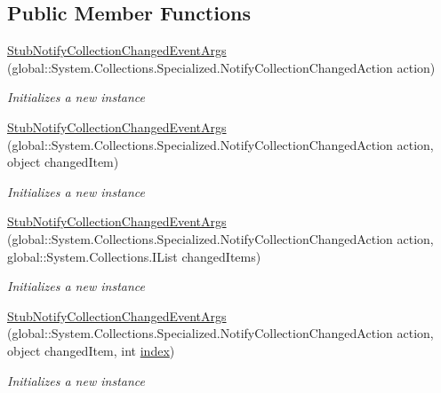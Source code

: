 \subsection*{Public Member Functions}
\begin{DoxyCompactItemize}
\item 
\hyperlink{class_system_1_1_collections_1_1_specialized_1_1_fakes_1_1_stub_notify_collection_changed_event_args_ad840faa1e60b7a0782ac3a5e3e133f4e}{Stub\-Notify\-Collection\-Changed\-Event\-Args} (global\-::\-System.\-Collections.\-Specialized.\-Notify\-Collection\-Changed\-Action action)
\begin{DoxyCompactList}\small\item\em Initializes a new instance\end{DoxyCompactList}\item 
\hyperlink{class_system_1_1_collections_1_1_specialized_1_1_fakes_1_1_stub_notify_collection_changed_event_args_a1585f375edf51ed7a6d9cac7e947d1b8}{Stub\-Notify\-Collection\-Changed\-Event\-Args} (global\-::\-System.\-Collections.\-Specialized.\-Notify\-Collection\-Changed\-Action action, object changed\-Item)
\begin{DoxyCompactList}\small\item\em Initializes a new instance\end{DoxyCompactList}\item 
\hyperlink{class_system_1_1_collections_1_1_specialized_1_1_fakes_1_1_stub_notify_collection_changed_event_args_a2475e02f8d51cc1acfb1936dfca3a4f0}{Stub\-Notify\-Collection\-Changed\-Event\-Args} (global\-::\-System.\-Collections.\-Specialized.\-Notify\-Collection\-Changed\-Action action, global\-::\-System.\-Collections.\-I\-List changed\-Items)
\begin{DoxyCompactList}\small\item\em Initializes a new instance\end{DoxyCompactList}\item 
\hyperlink{class_system_1_1_collections_1_1_specialized_1_1_fakes_1_1_stub_notify_collection_changed_event_args_a0e4812e09d913eb1f40d61caabe88c58}{Stub\-Notify\-Collection\-Changed\-Event\-Args} (global\-::\-System.\-Collections.\-Specialized.\-Notify\-Collection\-Changed\-Action action, object changed\-Item, int \hyperlink{jquery-1_810_82-vsdoc_8js_a75bb12d1f23302a9eea93a6d89d0193e}{index})
\begin{DoxyCompactList}\small\item\em Initializes a new instance\end{DoxyCompactList}\item 

\end{DoxyCompactItemize}

